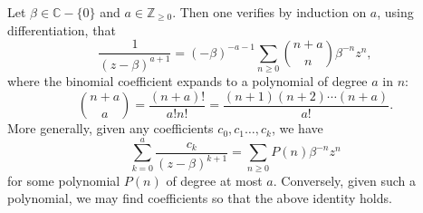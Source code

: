 \documentclass[reqno]{amsart}  \numberwithin{theorem}{section} \numberwithin{equation}{section}
\begin{document}
\begin{example}
  Let $\beta \in \mathbb{C} - \{0\}$ and $a \in \mathbb{Z}_{\geq 0}$.  Then one verifies by induction on $a$, using differentiation, that
  \begin{equation*}
    \frac{1}{(z - \beta)^{a+1}} =
    (-\beta)^{-a-1}
    \sum_{n \geq 0}
    \binom{n + a}{n} \beta^{-n} z^n,
  \end{equation*}
  where the binomial coefficient expands to a polynomial of degree $a$ in $n$:
  \begin{equation*}
    \binom{n+a}{a} = \frac{(n+a)!}{a! n!} =
    \frac{(n+1) (n+2) \dotsb (n+a)}{a!}.
  \end{equation*}
  More generally, given any coefficients $c_0, c_1\dotsc, c_k$, we have
  \begin{equation*}
    \sum_{k=0}^{a}
    \frac{c_k}{(z - \beta)^{k+1}} = \sum_{n \geq 0} P(n) \beta^{-n} z^n
  \end{equation*}
  for some polynomial $P(n)$ of degree at most $a$.  Conversely, given such a polynomial, we may find coefficients so that the above identity holds.
\end{example}
\end{document}
